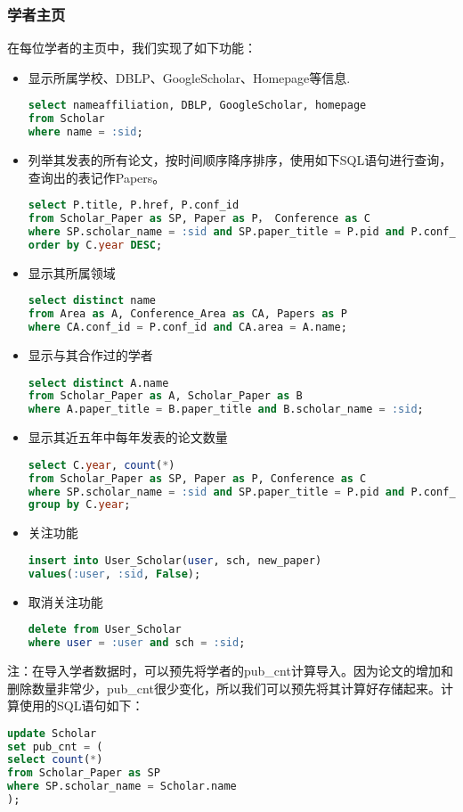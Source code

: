 \subsubsection{学者主页}
\label{sec:scholar}
在每位学者的主页中，我们实现了如下功能：
\begin{itemize}
\item 显示所属学校、DBLP、GoogleScholar、Homepage等信息.
\begin{lstlisting}[language=SQL]
select nameaffiliation, DBLP, GoogleScholar, homepage
from Scholar
where name = :sid;
\end{lstlisting}
\item 列举其发表的所有论文，按时间顺序降序排序，使用如下SQL语句进行查询，查询出的表记作Papers。
\begin{lstlisting}[language=SQL]
select P.title, P.href, P.conf_id
from Scholar_Paper as SP, Paper as P， Conference as C
where SP.scholar_name = :sid and SP.paper_title = P.pid and P.conf_id = C.cid
order by C.year DESC;
\end{lstlisting}
\item 显示其所属领域
\begin{lstlisting}[language=SQL]
select distinct name
from Area as A, Conference_Area as CA, Papers as P
where CA.conf_id = P.conf_id and CA.area = A.name;
\end{lstlisting}
\item 显示与其合作过的学者
\begin{lstlisting}[language=SQL]
select distinct A.name
from Scholar_Paper as A, Scholar_Paper as B
where A.paper_title = B.paper_title and B.scholar_name = :sid;
\end{lstlisting}
\item 显示其近五年中每年发表的论文数量
\begin{lstlisting}[language=SQL]
select C.year, count(*)
from Scholar_Paper as SP, Paper as P, Conference as C
where SP.scholar_name = :sid and SP.paper_title = P.pid and P.conf_id = C.cid
group by C.year;
\end{lstlisting}
\item 关注功能
\begin{lstlisting}[language=SQL]
insert into User_Scholar(user, sch, new_paper)
values(:user, :sid, False);
\end{lstlisting}
\item 取消关注功能
\begin{lstlisting}[language=SQL]
delete from User_Scholar
where user = :user and sch = :sid;
\end{lstlisting}
\end{itemize}
注：在导入学者数据时，可以预先将学者的pub\_cnt计算导入。因为论文的增加和删除数量非常少，pub\_cnt很少变化，所以我们可以预先将其计算好存储起来。计算使用的SQL语句如下：
\begin{lstlisting}[language=SQL]
update Scholar
set pub_cnt = (
select count(*)
from Scholar_Paper as SP
where SP.scholar_name = Scholar.name
);
\end{lstlisting}

